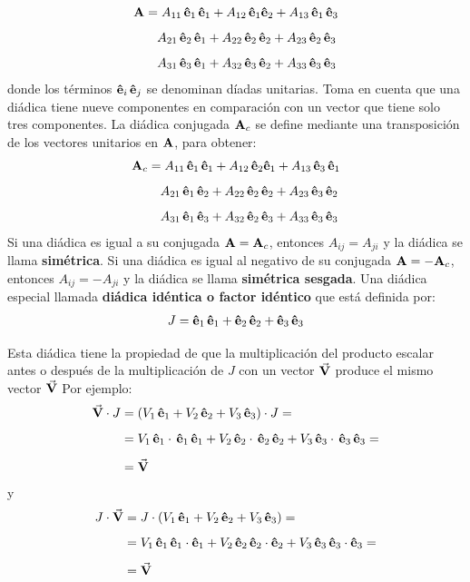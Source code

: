 \documentclass[hidelinks,12pt]{article}
\begin{document}
\begin{align*}
\vb{A} &= A_{11} \, \vu{e}_{1} \, \vu{e}_{1} + A_{12} \, \vu{e}_{1} \vu{e}_{2} + A_{13} \, \vu{e}_{1} \, \vu{e}_{3} \\[0.5em]  
&{\quad} A_{21} \, \vu{e}_{2} \, \vu{e}_{1} + A_{22} \, \vu{e}_{2} \, \vu{e}_{2} + A_{23} \, \vu{e}_{2} \, \vu{e}_{3} \\[0.5em]
&{\quad} A_{31} \, \vu{e}_{3} \, \vu{e}_{1} + A_{32} \, \vu{e}_{3} \, \vu{e}_{2} + A_{33} \, \vu{e}_{3} \, \vu{e}_{3}    
\end{align*}
donde los términos $\vu{e}_{i} \, \vu{e}_{j}$ se denominan díadas unitarias. Toma en cuenta que una diádica tiene nueve componentes en comparación con un vector que tiene solo tres componentes. La diádica conjugada $\vb{A}_{c}$ se define mediante una transposición de los vectores unitarios en $\vb{A}$, para obtener:
\begin{align*}
\vb{A}_{c} &= A_{11} \, \vu{e}_{1} \, \vu{e}_{1} + A_{12} \, \vu{e}_{2} \vu{e}_{1} + A_{13} \, \vu{e}_{3} \, \vu{e}_{1} \\[0.5em]  
&{\quad} A_{21} \, \vu{e}_{1} \, \vu{e}_{2} + A_{22} \, \vu{e}_{2} \, \vu{e}_{2} + A_{23} \, \vu{e}_{3} \, \vu{e}_{2} \\[0.5em]
&{\quad} A_{31} \, \vu{e}_{1} \, \vu{e}_{3} + A_{32} \, \vu{e}_{2} \, \vu{e}_{3} + A_{33} \, \vu{e}_{3} \, \vu{e}_{3}    
\end{align*}
Si una diádica es igual a su conjugada $\vb{A} = \vb{A}_{c}$, entonces $A_{ij} = A_{ji}$ y la diádica se llama \textbf{simétrica}. Si una diádica es igual al negativo de su conjugada $\vb{A} = - \vb{A}_{c}$, entonces $A_{ij} = - A_{ji}$ y la diádica se llama \textbf{simétrica sesgada}. Una diádica especial llamada \textbf{diádica idéntica o factor idéntico} que está definida por:
\begin{align*}
J = \vu{e}_{1} \, \vu{e}_{1} + \vu{e}_{2} \, \vu{e}_{2} + \vu{e}_{3} \, \vu{e}_{3}
\end{align*}

Esta diádica tiene la propiedad de que la multiplicación del producto escalar antes o después de la multiplicación de $J$ con un vector $\va{V}$ produce el mismo vector $\va{V}$ Por ejemplo:
\begin{align*}
\va{V} \cdot J &= ( V_{1} \, \vu{e}_{1} + V_{2} \, \vu{e}_{2} + V_{3}  \, \vu{e}_{3} ) \cdot J = \\[0.5em]
&= V_{1} \, \vu{e}_{1} \cdot \, \vu{e}_{1} \, \vu{e}_{1} + V_{2} \, \vu{e}_{2} \cdot \,\vu{e}_{2} \, \vu{e}_{2} + V_{3} \,\vu{e}_{3} \cdot \, \vu{e}_{3} \, \vu{e}_{3} = \\[0.5em]
&= \va{V}
\end{align*}
y
\begin{align*}
J \cdot \va{V} &= J \cdot (V_{1} \, \vu{e}_{1} + V_{2} \, \vu{e}_{2} + V_{3} \, \vu{e}_{3}) = \\[0.5em]
&= V_{1} \, \vu{e}_{1} \, \vu{e}_{1} \cdot \vu{e}_{1} + V_{2} \, \vu{e}_{2} \, \vu{e}_{2} \cdot \vu{e}_{2} + V_{3} \, \vu{e}_{3} \, \vu{e}_{3} \cdot \vu{e}_{3} = \\[0.5em]
&= \va{V}
\end{align*}
\end{document}
